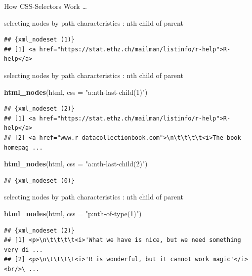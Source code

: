 \documentclass[ignorenonframetext,]{beamer}
\newenvironment{Shaded}{\begin{snugshade}}{\end{snugshade}}
\newcommand{\KeywordTok}[1]{\textcolor[rgb]{0.13,0.29,0.53}{\textbf{{#1}}}}
\newcommand{\DataTypeTok}[1]{\textcolor[rgb]{0.13,0.29,0.53}{{#1}}}
\newcommand{\StringTok}[1]{\textcolor[rgb]{0.31,0.60,0.02}{{#1}}}
\newcommand{\NormalTok}[1]{{#1}}
\begin{document}
\begin{frame}[fragile]{How CSS-Selectors Work \ldots{}}
\begin{block}{selecting nodes by path characteristics : nth child of
parent}
\begin{verbatim}
## {xml_nodeset (1)}
## [1] <a href="https://stat.ethz.ch/mailman/listinfo/r-help">R-help</a>
\end{verbatim}

\end{block}

\begin{block}{selecting nodes by path characteristics : nth child of
parent}

\begin{Shaded}
\begin{Highlighting}[]
\KeywordTok{html_nodes}\NormalTok{(html, }\DataTypeTok{css =} \StringTok{"a:nth-last-child(1)"}\NormalTok{)}
\end{Highlighting}
\end{Shaded}

\begin{verbatim}
## {xml_nodeset (2)}
## [1] <a href="https://stat.ethz.ch/mailman/listinfo/r-help">R-help</a>
## [2] <a href="www.r-datacollectionbook.com">\n\t\t\t\t<i>The book homepag ...
\end{verbatim}

\begin{Shaded}
\begin{Highlighting}[]
\KeywordTok{html_nodes}\NormalTok{(html, }\DataTypeTok{css =} \StringTok{"a:nth-last-child(2)"}\NormalTok{)}
\end{Highlighting}
\end{Shaded}

\begin{verbatim}
## {xml_nodeset (0)}
\end{verbatim}

\end{block}

\begin{block}{selecting nodes by path characteristics : nth child of
parent}

\begin{Shaded}
\begin{Highlighting}[]
\KeywordTok{html_nodes}\NormalTok{(html, }\DataTypeTok{css =} \StringTok{"p:nth-of-type(1)"}\NormalTok{)}
\end{Highlighting}
\end{Shaded}

\begin{verbatim}
## {xml_nodeset (2)}
## [1] <p>\n\t\t\t\t<i>'What we have is nice, but we need something very di ...
## [2] <p>\n\t\t\t\t<i>'R is wonderful, but it cannot work magic'</i><br/>\ ...
\end{verbatim}

\end{block}

\end{frame}
\end{document}

